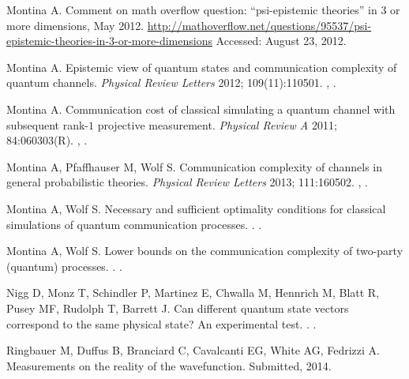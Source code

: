 \documentclass[DIV=calc,fontsize=12pt]{scrartcl} %
\theoremstyle{definition}
\theoremstyle{plain}
\begin{document}
\begin{thebibliography}{10}
Montina A.
\newblock Comment on math overflow question: ``psi-epistemic theories'' in 3 or more dimensions, May 2012.
\newblock
\url{http://mathoverflow.net/questions/95537/psi-epistemic-theories-in-3-or-more-dimensions}
Accessed: August 23, 2012.

Montina A.
\newblock Epistemic view of quantum states and communication complexity of quantum channels.
\newblock \emph{Physical Review Letters} 2012; 109(11):110501.
\newblock \href {http://arxiv.org/abs/1206.2961} {},
\href {http://dx.doi.org/10.1103/PhysRevLett.109.110501}
{}.

Montina A.
\newblock Communication cost of classical simulating a quantum channel with
subsequent rank-$1$ projective measurement.
\newblock \emph{Physical Review A} 2011; 84:060303(R).
\newblock \href {http://arxiv.org/abs/1110.5944} {},
\href {http://dx.doi.org/10.1103/PhysRevA.84.060303}
{}.

Montina A, Pfaffhauser M, Wolf S.
\newblock Communication complexity of channels in general probabilistic
theories.
\newblock \emph{Physical Review Letters} 2013; 111:160502.
\newblock \href {http://arxiv.org/abs/1301.4441} {},
\href {http://dx.doi.org/10.1103/PhysRevLett.111.160502}
{}.

Montina A, Wolf S.
\newblock Necessary and sufficient optimality conditions for classical simulations of quantum communication processes.
.
\newblock \href {http://arxiv.org/abs/1402.6299} {}.

Montina A, Wolf S.
\newblock Lower bounds on the communication complexity of two-party (quantum)
processes.
.
\newblock \href {http://arxiv.org/abs/1401.4126} {}.

Nigg D, Monz T, Schindler P, Martinez E, Chwalla M, Hennrich M, Blatt R, Pusey MF, Rudolph T, Barrett J.
\newblock Can different quantum state vectors correspond to the same physical state? An experimental test.
.
\newblock \href {http://arxiv.org/abs/1211.0942} {}.

Ringbauer M, Duffus B, Branciard C, Cavalcanti EG, White AG, Fedrizzi A.
\newblock Measurements on the reality of the wavefunction.
\newblock Submitted, 2014.


\end{thebibliography}
\end{document}
